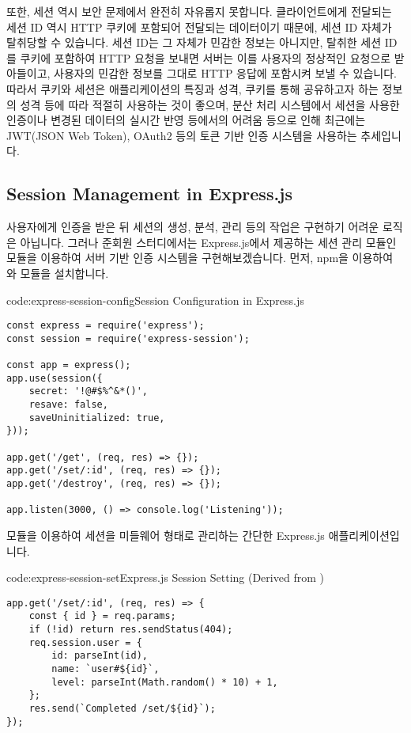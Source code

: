 또한, 세션 역시 보안 문제에서 완전히 자유롭지 못합니다. 클라이언트에게 전달되는 세션 ID 역시 HTTP 쿠키에 포함되어 전달되는 데이터이기 때문에, 세션 ID 자체가 탈취당할 수 있습니다. 세션 ID는 그 자체가 민감한 정보는 아니지만, 탈취한 세션 ID를 쿠키에 포함하여 HTTP 요청을 보내면 서버는 이를 사용자의 정상적인 요청으로 받아들이고, 사용자의 민감한 정보를 그대로 HTTP 응답에 포함시켜 보낼 수 있습니다.
따라서 쿠키와 세션은 애플리케이션의 특징과 성격, 쿠키를 통해 공유하고자 하는 정보의 성격 등에 따라 적절히 사용하는 것이 좋으며, 분산 처리 시스템에서 세션을 사용한 인증이나 변경된 데이터의 실시간 반영 등에서의 어려움 등으로 인해 최근에는 JWT(JSON Web Token), OAuth2 등의 토큰 기반 인증 시스템을 사용하는 추세입니다.

\subsection*{Session Management in Express.js}

사용자에게 인증을 받은 뒤 세션의 생성, 분석, 관리 등의 작업은 구현하기 어려운 로직은 아닙니다. 그러나 준회원 스터디에서는 Express.js에서 제공하는 세션 관리 모듈인  모듈을 이용하여 서버 기반 인증 시스템을 구현해보겠습니다. 먼저, npm을 이용하여 와  모듈을 설치합니다.

\begin{codeenv}{code:express-session-config}{Session Configuration in Express.js}\begin{verbatim}
const express = require('express');
const session = require('express-session');

const app = express();
app.use(session({
    secret: '!@#$%^&*()',
    resave: false,
    saveUninitialized: true,
}));

app.get('/get', (req, res) => {});
app.get('/set/:id', (req, res) => {});
app.get('/destroy', (req, res) => {});

app.listen(3000, () => console.log('Listening'));
\end{verbatim}
\end{codeenv}

\는  모듈을 이용하여 세션을 미들웨어 형태로 관리하는 간단한 Express.js 애플리케이션입니다.

\begin{codeenv}{code:express-session-set}{Express.js Session Setting (Derived from )}\begin{verbatim}
app.get('/set/:id', (req, res) => {
    const { id } = req.params;
    if (!id) return res.sendStatus(404);
    req.session.user = {
        id: parseInt(id),
        name: `user#${id}`,
        level: parseInt(Math.random() * 10) + 1,
    };
    res.send(`Completed /set/${id}`);
});
\end{verbatim}
\end{codeenv}

